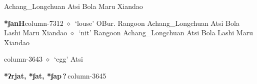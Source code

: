          Achang\_Longchuan 
\hspace{1ex}
         Atsi 
\hspace{1ex}
         Bola 
\hspace{1ex}
         Maru 
\hspace{1ex}
         Xiandao 
  \item {\footnotesize \textbf{*ʃanH}}{\tiny column-7312}
         $\diamond$~`louse'
         OBur. 
\hspace{1ex}
         Rangoon 
\hspace{1ex}
         Achang\_Longchuan 
\hspace{1ex}
         Atsi 
\hspace{1ex}
         Bola 
\hspace{1ex}
         Lashi 
\hspace{1ex}
         Maru 
\hspace{1ex}
         Xiandao 
\hspace{1ex}
         $\diamond$~`nit'
         Rangoon 
\hspace{1ex}
         Achang\_Longchuan 
\hspace{1ex}
         Atsi 
\hspace{1ex}
         Bola 
\hspace{1ex}
         Lashi 
\hspace{1ex}
         Maru 
\hspace{1ex}
         Xiandao 
  \item {\footnotesize \textbf{}}{\tiny column-3643}
         $\diamond$~`egg'
         Atsi 
  \item {\footnotesize \textbf{*ʔrjat, *ʃat, *ʃap\,?\,}}{\tiny column-3645}
